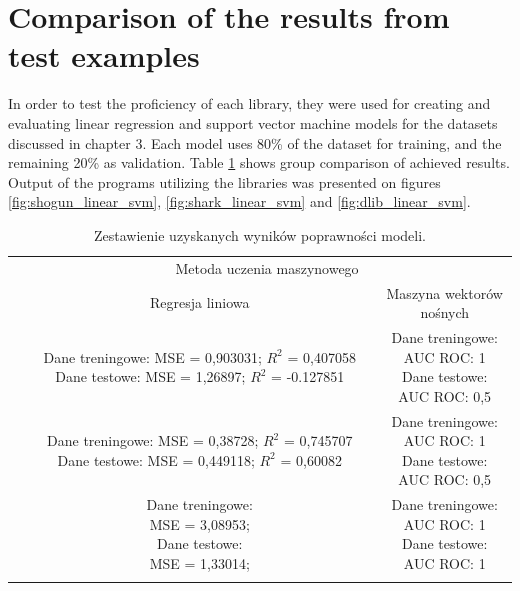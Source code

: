 \section{Comparison of the results from test examples}

In order to test the proficiency of each library, they were used for creating and evaluating linear regression and support vector machine models for the datasets discussed in chapter 3. Each model uses 80\% of the dataset for training, and the remaining 20\% as validation. Table \ref{tab:models} shows group comparison of achieved results. Output of the programs utilizing the libraries was presented on figures \ref{fig:shogun_linear_svm}, \ref{fig:shark_linear_svm} and \ref{fig:dlib_linear_svm}.

\newpage
\begin{longtable}{c | c | c }
	\centering
	\multirow{2}{*}{\makecell{Biblioteka}} & \multicolumn{2}{c}{Metoda uczenia maszynowego} \\
	\cline{2-3}
	& Regresja liniowa & Maszyna wektorów nośnych \\
	\hline
	\makecell{Shogun} & \makecell{Dane treningowe: \\ MSE = 0,903031; $R^2$ = 0,407058 \\ Dane testowe: \\ MSE = 1,26897; $R^2$ = -0.127851} & \makecell{Dane treningowe: \\ AUC ROC: 1 \\ Dane testowe: \\ AUC ROC: 0,5} \\
	\hline
	\makecell{Shark} & \makecell{Dane treningowe: \\ MSE = 0,38728; $R^2$ = 0,745707 \\ Dane testowe: \\ MSE = 0,449118; $R^2$ = 0,60082} & \makecell{Dane treningowe: \\ AUC ROC: 1 \\ Dane testowe: \\ AUC ROC: 0,5} \\
	\hline
	\makecell{Dlib} & \makecell{Dane treningowe: \\ MSE = 3,08953; \\ Dane testowe: \\ MSE = 1,33014; } & \makecell{Dane treningowe: \\ AUC ROC: 1 \\ Dane testowe: \\ AUC ROC: 1} \\
	\caption{Zestawienie uzyskanych wyników poprawności modeli.}
	\label{tab:models}
\end{longtable} 

